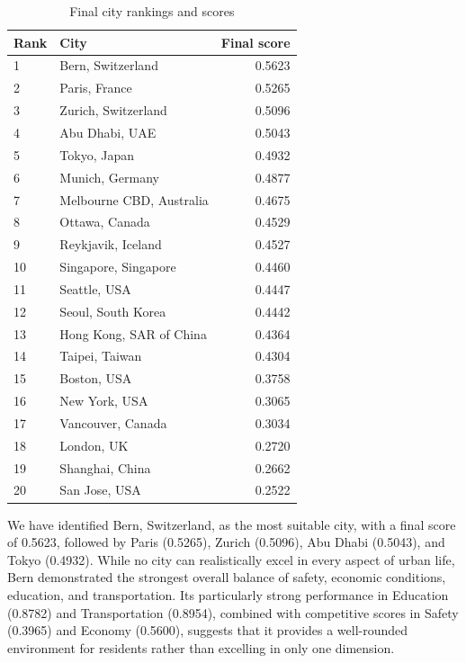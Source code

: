 \documentclass[11pt,letterpaper]{article}
\renewcommand{\arraystretch}{1.12}
\begin{document}
\begin{table}[H]
\centering
\renewcommand{\thetable}{6.4}
\caption{Final city rankings and scores}
\normalsize
\renewcommand{\arraystretch}{1.08}
\setlength{\tabcolsep}{9pt}
\begin{tabular}{@{}llr@{}}
\toprule
\textbf{Rank} & \textbf{City} & \textbf{Final score} \\
\midrule
1 & Bern, Switzerland & 0.5623 \\
2 & Paris, France & 0.5265 \\
3 & Zurich, Switzerland & 0.5096 \\
4 & Abu Dhabi, UAE & 0.5043 \\
5 & Tokyo, Japan & 0.4932 \\
6 & Munich, Germany & 0.4877 \\
7 & Melbourne CBD, Australia & 0.4675 \\
8 & Ottawa, Canada & 0.4529 \\
9 & Reykjavik, Iceland & 0.4527 \\
10 & Singapore, Singapore & 0.4460 \\
11 & Seattle, USA & 0.4447 \\
12 & Seoul, South Korea & 0.4442 \\
13 & Hong Kong, SAR of China & 0.4364 \\
14 & Taipei, Taiwan & 0.4304 \\
15 & Boston, USA & 0.3758 \\
16 & New York, USA & 0.3065 \\
17 & Vancouver, Canada & 0.3034 \\
18 & London, UK & 0.2720 \\
19 & Shanghai, China & 0.2662 \\
20 & San Jose, USA & 0.2522 \\
\bottomrule
\end{tabular}
\end{table}

We have identified Bern, Switzerland, as the most suitable city, with a final score of 
0.5623, followed by Paris (0.5265), Zurich (0.5096), Abu Dhabi (0.5043), and Tokyo (0.4932). 
While no city can realistically excel in every aspect of urban life, Bern demonstrated the 
strongest overall balance of safety, economic conditions, education, and transportation. Its 
particularly strong performance in Education (0.8782) and Transportation (0.8954), combined 
with competitive scores in Safety (0.3965) and Economy (0.5600), suggests that it provides a 
well-rounded environment for residents rather than excelling in only one dimension.
\end{document}
